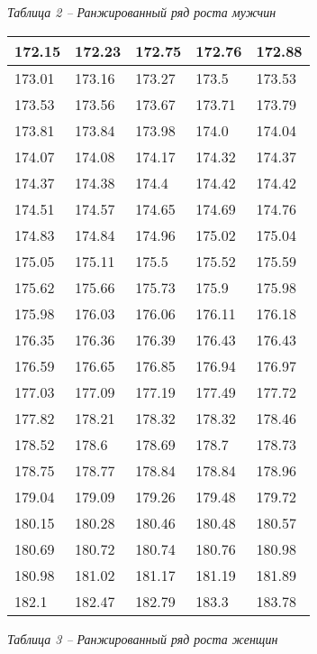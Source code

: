 \noindent\textit{Таблица 2 -- Ранжированный ряд роста мужчин}
\begin{longtable}{|p{2.5cm}|p{2.5cm}|p{2.5cm}|p{2.5cm}|p{2.5cm}|}
    \hline
    172.15 & 172.23 & 172.75 & 172.76 & 172.88 \\\hline
    173.01 & 173.16 & 173.27 & 173.5  & 173.53 \\\hline
    173.53 & 173.56 & 173.67 & 173.71 & 173.79 \\\hline
    173.81 & 173.84 & 173.98 & 174.0  & 174.04 \\\hline
    174.07 & 174.08 & 174.17 & 174.32 & 174.37 \\\hline
    174.37 & 174.38 & 174.4  & 174.42 & 174.42 \\\hline
    174.51 & 174.57 & 174.65 & 174.69 & 174.76 \\\hline
    174.83 & 174.84 & 174.96 & 175.02 & 175.04 \\\hline
    175.05 & 175.11 & 175.5  & 175.52 & 175.59 \\\hline
    175.62 & 175.66 & 175.73 & 175.9  & 175.98 \\\hline
    175.98 & 176.03 & 176.06 & 176.11 & 176.18 \\\hline
    176.35 & 176.36 & 176.39 & 176.43 & 176.43 \\\hline
    176.59 & 176.65 & 176.85 & 176.94 & 176.97 \\\hline
    177.03 & 177.09 & 177.19 & 177.49 & 177.72 \\\hline
    177.82 & 178.21 & 178.32 & 178.32 & 178.46 \\\hline
    178.52 & 178.6  & 178.69 & 178.7  & 178.73 \\\hline
    178.75 & 178.77 & 178.84 & 178.84 & 178.96 \\\hline
    179.04 & 179.09 & 179.26 & 179.48 & 179.72 \\\hline
    180.15 & 180.28 & 180.46 & 180.48 & 180.57 \\\hline
    180.69 & 180.72 & 180.74 & 180.76 & 180.98 \\\hline
    180.98 & 181.02 & 181.17 & 181.19 & 181.89 \\\hline
    182.1  & 182.47 & 182.79 & 183.3  & 183.78 \\\hline
\end{longtable}
\pagebreak
\noindent\textit{Таблица 3 -- Ранжированный ряд роста женщин}
